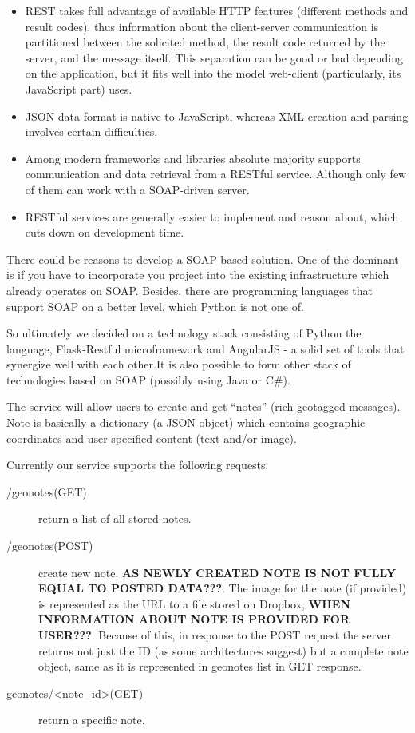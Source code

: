 \documentclass[12pt,a4paper]{article}
\begin{document}
\begin{itemize}
\item REST takes full advantage of available HTTP features (different
  methods and result codes), thus information about the client-server
  communication is partitioned between the solicited method, the
  result code returned by the server, and the message itself. This
  separation can be good or bad depending on the application, but it
  fits well into the model web-client (particularly, its JavaScript
  part) uses.
\item JSON data format is native to JavaScript, whereas XML creation
  and parsing involves certain difficulties.
\item Among modern frameworks and libraries absolute majority supports
  communication and data retrieval from a RESTful service. Although
  only few of them can work with a SOAP-driven server.
\item RESTful services are generally easier to implement and reason
  about, which cuts down on development time.
\end{itemize}

There could be reasons to develop a SOAP-based solution. One of the
dominant is if you have to incorporate you project into the existing
infrastructure which already operates on SOAP. Besides, there are
programming languages that support SOAP on a better level, which
Python is not one of.

So ultimately we decided on a technology stack consisting of Python
the language, Flask-Restful microframework and AngularJS - a solid set
of tools that synergize well with each other.It is also possible to
form other stack of technologies based on SOAP (possibly using Java or
C\#).

The service will allow users to create and get ``notes'' (rich geotagged
messages). Note is basically a dictionary (a JSON object) which
contains geographic coordinates and user-specified content (text
and/or image).

Currently our service supports the following requests:

\begin{description}
\item[/geonotes(GET)] return a list of all stored notes.
\item[/geonotes(POST)] create new note. \textbf{AS NEWLY CREATED NOTE
  IS NOT FULLY EQUAL TO POSTED DATA???}. The image for the note (if
  provided) is represented as the URL to a file stored on Dropbox,
  \textbf{WHEN INFORMATION ABOUT NOTE IS PROVIDED FOR USER???}.
  Because of this, in response to the POST request the server returns
  not just the ID (as some architectures suggest) but a complete note
  object, same as it is represented in geonotes list in GET response.
\item[geonotes/<note\_id>(GET)] return a specific note.
\end{description}
\end{document}
